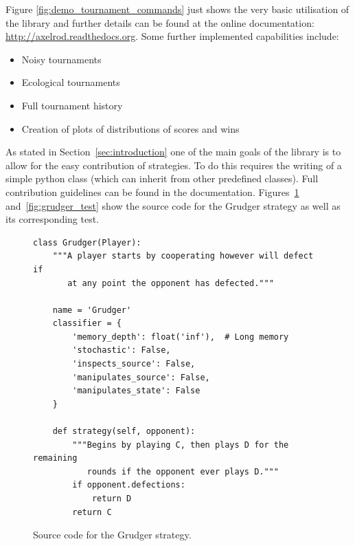 \documentclass{article}
\begin{document}
Figure \ref{fig:demo_tournament_commands} just shows the very basic utilisation
of the library and further details can be found at the online documentation:
\url{http://axelrod.readthedocs.org}. Some further implemented capabilities
include:

\begin{itemize}
    \item Noisy tournaments
    \item Ecological tournaments
    \item Full tournament history
    \item Creation of plots of distributions of scores and wins
\end{itemize}

As stated in Section~\ref{sec:introduction} one of the main goals of the library
is to allow for the easy contribution of strategies. To do this requires the
writing of a simple python class (which can inherit from other predefined
classes). Full contribution guidelines can be found in the documentation.
Figures~\ref{fig:grudger} and~\ref{fig:grudger_test} show the source code for
the Grudger strategy as well as its corresponding test.

\begin{figure}[!hbtp]
    \begin{verbatim}
class Grudger(Player):
    """A player starts by cooperating however will defect if
       at any point the opponent has defected."""

    name = 'Grudger'
    classifier = {
        'memory_depth': float('inf'),  # Long memory
        'stochastic': False,
        'inspects_source': False,
        'manipulates_source': False,
        'manipulates_state': False
    }

    def strategy(self, opponent):
        """Begins by playing C, then plays D for the remaining
           rounds if the opponent ever plays D."""
        if opponent.defections:
            return D
        return C
    \end{verbatim}
    \caption{Source code for the Grudger strategy.}
    \label{fig:grudger}
\end{figure}
\end{document}
